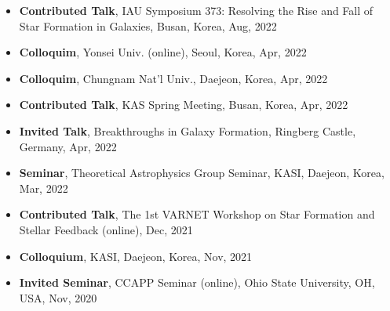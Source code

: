 \documentclass[11pt,letterpaper,roman]{moderncv}        %
\begin{document}
\begin{itemize}
\item \textbf{Contributed Talk},
  IAU Symposium 373: Resolving the Rise and Fall of Star Formation in Galaxies, Busan, Korea, Aug, 2022 %
\item \textbf{Colloquim},
  Yonsei Univ. (online), Seoul, Korea, Apr, 2022 %
\item \textbf{Colloquim},
  Chungnam Nat'l Univ., Daejeon, Korea, Apr, 2022 %
\item \textbf{Contributed Talk},
  KAS Spring Meeting, Busan, Korea, Apr, 2022 %
\item \textbf{Invited Talk},
  Breakthroughs in Galaxy Formation, Ringberg Castle, Germany, Apr, 2022 %
\item \textbf{Seminar},
  Theoretical Astrophysics Group Seminar, KASI, Daejeon, Korea, Mar, 2022 %
\item \textbf{Contributed Talk},
  The 1st VARNET Workshop on Star Formation and Stellar Feedback (online), Dec, 2021 %
\item \textbf{Colloquium},
  KASI, Daejeon, Korea, Nov, 2021 %
\item \textbf{Invited Seminar},
  CCAPP Seminar (online), Ohio State University, OH, USA, Nov, 2020 %

\end{itemize}
\end{document}
